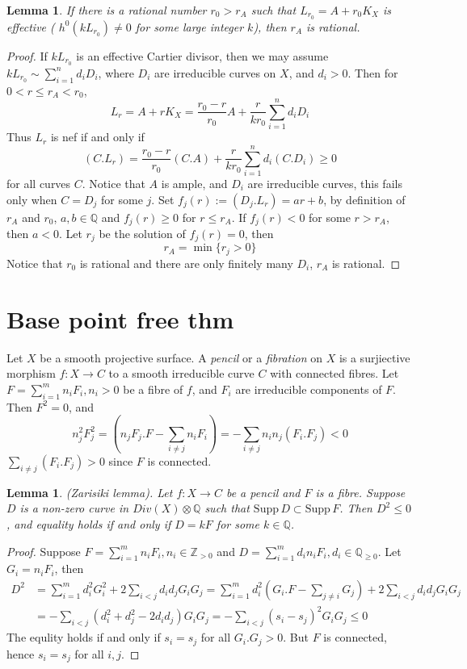 \documentclass{article}
\newtheorem{lem}[defn]{Lemma}
\begin{document}
\begin{lem}
	If there is a rational number $ r_0>r_A $ such that $ L_{r_0}=A+r_0K_X $ is effective ( $ h^0(kL_{r_0})\neq 0 $ for some large integer $ k $), then $ r_A $ is rational.
\end{lem}
\begin{proof}
	If $ kL_{r_0} $ is an effective Cartier divisor, then we may assume $ kL_{r_0}\sim \sum_{i=1}^{n}d_iD_i  $, where $ D_i $ are irreducible curves on $ X $, and $ d_i>0 $. Then for $ 0<r\leqslant r_A< r_0 $,
	$$ L_r=A+rK_X=\frac{r_0-r}{r_0}A+\frac{r}{kr_0} \sum_{i=1}^{n}d_iD_i$$
	Thus $ L_r $ is nef if and only if  
	$$ (C.L_r)=\frac{r_0-r}{r_0}(C.A)+\frac{r}{kr_0} \sum_{i=1}^{n}d_i(C.D_i) \geqslant 0$$
	for all curves $ C $. Notice that $ A $ is ample, and $ D_i $ are irreducible curves, this fails only when  $ C=D_j $ for some $ j $. Set $ f_j(r):=(D_j.L_r)=ar+b $, by definition of $ r_A $ and $ r_0 $, $ a,b\in\mathbb{Q} $ and $  f_j(r)\geqslant0 $ for $ r\leqslant r_A $. If  $ f_j(r)<0 $ for some $ r>r_A $, then $ a<0 $. Let $ r_j $ be the solution of $ f_j(r)=0 $, then 
	$$ r_A=\min\{r_j>0\} $$
	Notice that $ r_0 $ is rational and there are only finitely many $ D_i $, $ r_A $ is rational.
\end{proof}

\section{Base point free thm}
Let $ X $ be a smooth projective surface. A \emph{pencil}  or a \emph{fibration}  on $ X $ is a surjiective morphism $ f:X\to C $ to a smooth irreducible curve $ C $ with connected fibres. Let $ F=\sum_{i=1}^{m}n_iF_i , n_i>0$ be a fibre of $ f $, and $ F_i $ are irreducible components of $ F $. Then $ F^2=0 $, and 
$$ n_j^2F_j^2=(n_jF_j.F-\sum_{i\neq j}n_iF_i)=-\sum_{i\neq j}n_in_j(F_i.F_j)<0 $$
$ \sum_{i\neq j}(F_i.F_j) >0$ since $ F $ is connected. 
\begin{lem}
	(Zarisiki lemma). Let $ f:X\to C $ be a pencil  and $ F $ is a fibre. Suppose $ D $ is a non-zero curve  in $ Div(X)\otimes \mathbb{Q} $ such that $ \mathrm{Supp}\,D \subset \mathrm{Supp}\,F  $. Then $ D^2\leqslant 0 $, and equality holds if and only if $ D=kF $ for some $ k\in \mathbb{Q} $.
\end{lem}
\begin{proof}
	Suppose $ F=\sum_{i=1} ^{m}n_iF_i, n_i\in \mathbb{Z}_{>0}$ and $ D=\sum_{i=1} ^{m}d_in_iF_i, d_i\in \mathbb{Q}_{\geqslant0} $. Let $ G_i=n_iF_i $, then
	\begin{equation*}
	\begin{aligned}
	D^2&=\sum_{i=1}^{m}d_i^2G_i^2+2\sum_{i<j}d_id_jG_iG_j=\sum_{i=1}^{m}d_i^2(G_i.F-\sum_{j\neq i}G_j)+ 2\sum_{i<j}d_id_jG_iG_j\\
	&=-\sum_{i<j}(d_i^2+d_j^2-2d_id_j)G_iG_j=-\sum_{i<j}(s_i-s_j)^2G_iG_j\leqslant0
	\end{aligned}
	\end{equation*}
	The equlity holds if and only if $ s_i=s_j $ for all $ G_i.G_j>0 $. But $ F $ is connected, hence $ s_i=s_j $ for all $ i,j $.
\end{proof}
\end{document}
